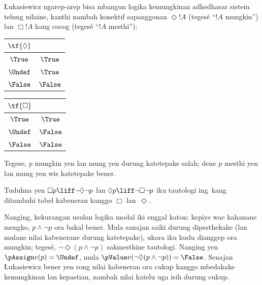\documentclass[../../../include/open-logic-section]{subfiles}
\begin{document}
\L ukasiewicz ngarep-arep bisa mbangun logika kemungkinan adhedhasar
sistem telung nilaine, kanthi nambah konektif sapanggonan $\Diamond
!A$ (tegesé ``$!A$ mungkin'') lan $\Box !A$ kang cocog (tegesé ``$!A$
mesthi''):
\begin{center}
  \begin{tabular}{c|c} 
    $\tf{\Diamond}$ & \\ 
    \hline  
    $\True$ & $\True$ \\ 
    $\Undef$ & $\True$ \\
    $\False$ & $\False$ 
  \end{tabular}
  \quad
  \begin{tabular}{c|c} 
    $\tf{\Box}$ & \\ 
    \hline  
    $\True$ & $\True$ \\ 
    $\Undef$ & $\False$ \\
    $\False$ & $\False$ 
  \end{tabular}
\end{center}
Tegese, $p$ mungkin yen lan mung yen durung katetepake salah;
dene $p$ mesthi yen lan mung yen wis katetepake bener.

\begin{prob}
  Tuduhna yen $\Box p \liff \lnot\Diamond \lnot p$ lan $\Diamond p \liff
  \lnot \Box \lnot p$ iku tautologi ing~\LogLuk[3] kang ditambahi
  tabel kabeneran kanggo $\Box$ lan~$\Diamond$.
\end{prob}

Nanging, kekurangan usulan logika modal iki enggal katon:
kepiye wae kahanane mengko, $p \land \lnot p$ ora bakal bener.
Mula sanajan saiki durung dipesthekake (lan mulane nilai kabenerane durung katetepake),
ukara iku kudu dianggep ora mungkin; tegesé,
$\lnot \Diamond(p \land \lnot p)$ sakmesthine tautologi.
Nanging yen $\pAssign v(p) = \Undef$, mula
$\pValue v(\lnot \Diamond(p \land \lnot p)) = \False$.
Senajan \L ukasiewicz bener yen rong nilai kabeneran ora cukup
kanggo mbedakake kemungkinan lan kepastian, nambah nilai katelu
uga isih durung cukup.
\end{document}
